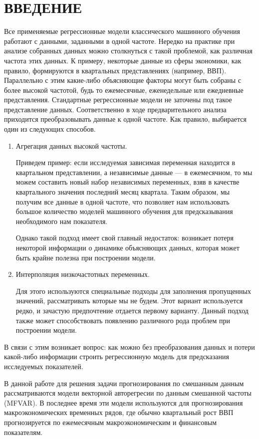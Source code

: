\documentclass[a4paper, 14pt]{extreport}
\numberwithin{equation}{subsection}
\numberwithin{equation}{section}
\begin{document}
	\chapter*{\centering ВВЕДЕНИЕ}
	Все применяемые регрессионные модели классического машинного обучения работают с данными, заданными в одной частоте. Нередко на практике при анализе собранных данных можно столкнуться с такой проблемой, как различная частота этих данных. К примеру, некоторые данные из сферы экономики, как правило, формируются в квартальных представлениях (например, ВВП). Параллельно с этим какие-либо объясняющие факторы могут быть собраны с более высокой частотой, будь то ежемесячные, еженедельные или ежедневные представления. Стандартные регрессионные модели не заточены под такое представление данных. Соответственно в ходе предварительного анализа приходится преобразовывать данные к одной частоте. Как правило, выбирается один из следующих способов.
	\begin{enumerate}
		\item Агрегация данных высокой частоты. 
		
		Приведем пример: если исследуемая зависимая переменная находится в квартальном представлении, а независимые данные --- в ежемесячном, то мы можем составить новый набор независимых переменных, взяв в качестве квартального значения последний месяц квартала. Таким образом, мы получим все данные в одной частоте, что позволяет нам использовать большое количество моделей машинного обучения для предсказывания необходимого нам показателя.
		
		Однако такой подход имеет свой главный недостаток:
		возникает потеря некоторой информации о динамике объясняющих данных, которая может быть крайне полезна при построении модели.
		\item Интерполяция низкочастотных
		переменных. 
		
		Для этого используются специальные подходы для заполнения пропущенных значений, рассматривать которые мы не будем. Этот вариант используется редко, и зачастую предпочтение отдается первому варианту. Данный подход также может способствовать появлению различного рода проблем при построении модели.
	\end{enumerate}
	В связи с этим возникает вопрос: как можно без преобразования данных и потери какой-либо информации строить регрессионную модель для предсказания исследуемых показателей. 
	
	В данной работе для решения задачи прогнозирования по смешанным данным рассматриваются модели векторной авторегресии по данным смешанной частоты (MFVAR). В последнее время эти модели используются для прогнозирования макроэкономических временных рядов, где обычно квартальный
	рост ВВП прогнозируется по ежемесячным макроэкономическим и финансовым показателям.
	
\end{document}

